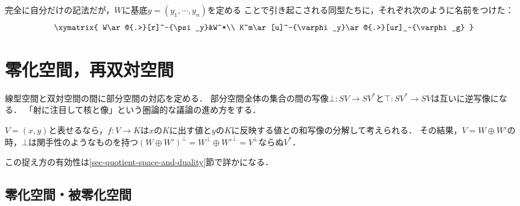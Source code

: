 \documentclass[uplatex, dvipdfmx]{jsreport}
\begin{document}
\begin{notation}
    完全に自分だけの記法だが，$W$に基底$y=(y_1,\cdots,y_n)$を定める
    ことで引き起こされる同型たちに，それぞれ次のように名前をつけた：
    \[\xymatrix{
        W\ar@{.>}[r]^-{\psi_y}&W^*\\
        K^m\ar[u]^-{\varphi_y}\ar@{.>}[ur]_-{\varphi_g}
    }\]
\end{notation}

\section{零化空間，再双対空間}

\begin{tcolorbox}[colframe=ForestGreen, colback=ForestGreen!10!white, breakable,
    title=射に注目して空間の内部構造に言及する手法の一般化]
    線型空間と双対空間の間に部分空間の対応を定める．
    部分空間全体の集合の間の写像$\bot:SV\to SV^*$と$\top:SV^*\to SV$は互いに逆写像になる．
    「射に注目して核と像」という圏論的な議論の進め方をする．

    $V=(x,y)$と表せるなら，$f:V\to K$は$x$の$K$に出す値と$y$の$K$に反映する値との和写像の分解して考えられる．
    その結果，$V=W\oplus W'$の時，$\bot$は関手性のようなものを持つ$(W\oplus W')^\bot=W^\bot\oplus W'^\bot=V^\bot$ならぬ$V^*$．
    
    この捉え方の有効性は\ref{sec-quotient-space-and-duality}節で詳かになる．
\end{tcolorbox}

\subsection{零化空間・被零化空間}
\end{document}
